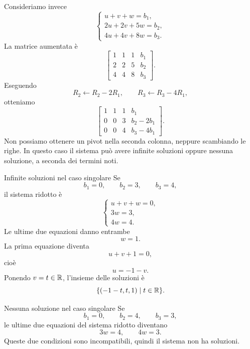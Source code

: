 \documentclass[a4paper]{article}
\begin{document}
Consideriamo invece
\[
    \begin{cases}
        u+v+w=b_1,\\
        2u+2v+5w=b_2,\\
        4u+4v+8w=b_3.
    \end{cases}
\]
La matrice aumentata è
\[
    \left[
        \begin{array}{ccc|c}
            1 & 1 & 1 & b_1\\
            2 & 2 & 5 & b_2\\
            4 & 4 & 8 & b_3
        \end{array}
    \right].
\]
Eseguendo
\[
    R_2\leftarrow R_2-2R_1,
    \qquad
    R_3\leftarrow R_3-4R_1,
\]
otteniamo
\[
    \left[
        \begin{array}{ccc|c}
            1 & 1 & 1 & b_1\\
            0 & 0 & 3 & b_2-2b_1\\
            0 & 0 & 4 & b_3-4b_1
        \end{array}
    \right].
\]
Non possiamo ottenere un pivot nella seconda colonna, neppure scambiando le righe. In questo caso il sistema può avere infinite soluzioni oppure nessuna soluzione, a seconda dei termini noti.

\begin{snippetexample}{Infinite soluzioni nel caso singolare}
    Se
    \[
        b_1=0,
        \qquad
        b_2=3,
        \qquad
        b_3=4,
    \]
    il sistema ridotto è
    \[
        \begin{cases}
            u+v+w=0,\\
            3w=3,\\
            4w=4.
        \end{cases}
    \]
    Le ultime due equazioni danno entrambe
    \[
        w=1.
    \]
    La prima equazione diventa
    \[
        u+v+1=0,
    \]
    cioè
    \[
        u=-1-v.
    \]
    Ponendo \(v=t\in\mathbb{R}\), l'insieme delle soluzioni è
    \[
        \{(-1-t,t,1)\mid t\in\mathbb{R}\}.
    \]
\end{snippetexample}

\begin{snippetexample}{Nessuna soluzione nel caso singolare}
    Se
    \[
        b_1=0,
        \qquad
        b_2=4,
        \qquad
        b_3=3,
    \]
    le ultime due equazioni del sistema ridotto diventano
    \[
        3w=4,
        \qquad
        4w=3.
    \]
    Queste due condizioni sono incompatibili, quindi il sistema non ha soluzioni.
\end{snippetexample}
\end{document}
